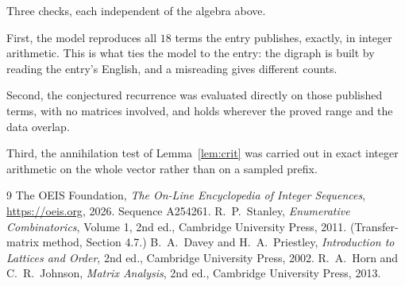 \documentclass[11pt,a4paper]{article}
\theoremstyle{plain}
\theoremstyle{definition}
\begin{document}
Three checks, each independent of the algebra above.

First, the model reproduces all $18$ terms the entry publishes, exactly, in integer
arithmetic. This is what ties the model to the entry: the digraph is built by reading the
entry's English, and a misreading gives different counts.

Second, the conjectured recurrence was evaluated directly on those published terms, with no
matrices involved, and holds wherever the proved range and the data overlap.

Third, the annihilation test of Lemma~\ref{lem:crit} was carried out in exact integer
arithmetic on the whole vector rather than on a sampled prefix.

\begin{thebibliography}{9}
 The OEIS Foundation, \emph{The On-Line Encyclopedia of Integer
Sequences}, \url{https://oeis.org}, 2026. Sequence A254261.
 R.~P.~Stanley, \emph{Enumerative Combinatorics}, Volume 1, 2nd ed.,
Cambridge University Press, 2011. (Transfer-matrix method, Section 4.7.)
 B.~A.~Davey and H.~A.~Priestley, \emph{Introduction to Lattices and
Order}, 2nd ed., Cambridge University Press, 2002.
 R.~A.~Horn and C.~R.~Johnson, \emph{Matrix Analysis}, 2nd ed., Cambridge
University Press, 2013.
\end{thebibliography}
\end{document}
